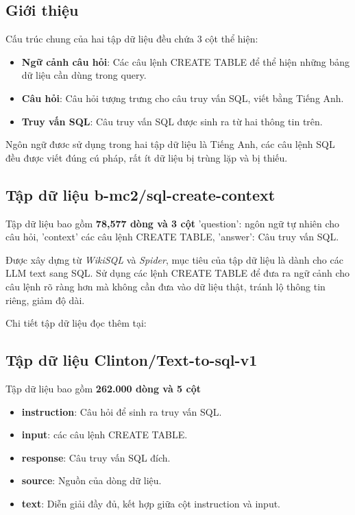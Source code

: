 \documentclass[a4paper, 10pt]{article}
\begin{document}
\subsection{Giới thiệu}
Cấu trúc chung của hai tập dữ liệu đều chứa 3 cột thể hiện:
\begin{itemize}
    \item \textbf{Ngữ cảnh câu hỏi}: Các câu lệnh CREATE TABLE để thể hiện những bảng dữ liệu cần dùng trong query.
    \item \textbf{Câu hỏi}: Câu hỏi tượng trưng cho câu truy vấn SQL, viết bằng Tiếng Anh.
    \item \textbf{Truy vấn SQL}: Câu truy vấn SQL được sinh ra từ hai thông tin trên.
\end{itemize}
Ngôn ngữ đươc sử dụng trong hai tập dữ liệu là Tiếng Anh, các câu lệnh SQL đều được viết đúng cú pháp, rất ít dữ liệu bị trùng lặp và bị thiếu. 

\subsection{Tập dữ liệu b-mc2/sql-create-context}
Tập dữ liệu bao gồm \textbf{78,577 dòng và 3 cột}
'question': ngôn ngữ tự nhiên cho câu hỏi, 'context' các câu lệnh CREATE TABLE,
'answer': Câu truy vấn SQL. 

Được xây dựng từ \textit{WikiSQL} và \textit{Spider}, mục tiêu của tập dữ liệu là dành cho các LLM text sang SQL. 
Sử dụng các lệnh CREATE TABLE để đưa ra ngữ cảnh cho câu lệnh rõ ràng hơn mà không cần đưa vào dữ liệu thật, tránh lộ thông tin riêng, giảm độ dài.

Chi tiết tập dữ liệu đọc thêm tại: \cite{b-mc2/sql-create-context}

\subsection{Tập dữ liệu Clinton/Text-to-sql-v1}

Tập dữ liệu bao gồm \textbf{262.000 dòng và 5 cột}

\begin{itemize}
    \item \textbf{instruction}: Câu hỏi để sinh ra truy vấn SQL.
    \item \textbf{input}: các câu lệnh CREATE TABLE.
    \item \textbf{response}: Câu truy vấn SQL đích.
    \item \textbf{source}: Nguồn của dòng dữ liệu.
    \item \textbf{text}: Diễn giải đầy đủ, kết hợp giữa cột instruction và input.
\end{itemize}
\end{document}
